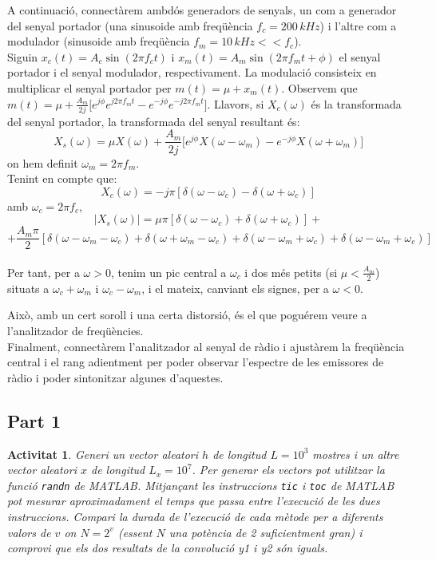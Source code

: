 \documentclass[11pt,a4]{article}
\numberwithin{equation}{section}
\theoremstyle{thmstyle}
\theoremstyle{thmstyle}
\theoremstyle{thmstyle}
\theoremstyle{thmstyle}
\theoremstyle{thmstyle}
\theoremstyle{thmstyle}
\theoremstyle{thmstyle}
\newtheorem{activity}{Activitat}
\begin{document}
A continuació, connectàrem ambdós generadors de senyals, un com a generador del senyal portador (una sinusoide amb freqüència $f_c=200\,kHz$) i l'altre com a modulador (sinusoide amb freqüència $f_m=10\,kHz << f_c$).
\\

Siguin $x_c(t)=A_c\sin(2\pi f_c t)$ i $x_m(t)=A_m\sin(2\pi f_m t+\phi)$ el senyal portador i el senyal modulador, respectivament. La modulació consisteix en multiplicar el senyal portador per $m(t)=\mu+x_m(t)$. Observem que $m(t) = \mu + \frac{A_m}{2j}\big[e^{j\phi} e^{j2\pi f_m t}-e^{-j\phi} e^{-j2\pi f_m t}\big]$.
Llavors, si $X_c(\omega)$ és la transformada del senyal portador, la transformada del senyal resultant és:
$$
X_s(\omega)=\mu X(\omega) + \frac{A_m}{2j}\big[e^{j\phi} X(\omega-\omega_m)-e^{-j\phi} X(\omega+\omega_m)\big]
$$
on hem definit $\omega_m = 2\pi f_m$.
\\

Tenint en compte que:
$$
X_c(\omega)=-j\pi[\delta(\omega-\omega_c)-\delta(\omega+\omega_c)]
$$
amb $\omega_c=2\pi f_c$,
$$
\vert X_s(\omega)\vert = \mu\pi[\delta(\omega-\omega_c) + \delta(\omega+\omega_c)]+
$$
$$
+\frac{A_m\pi}{2}[ \delta(\omega-\omega_m -\omega_c) + \delta(\omega+\omega_m -\omega_c) + \delta(\omega-\omega_m +\omega_c) + \delta(\omega-\omega_m +\omega_c)]
$$
\\

Per tant, per a $\omega>0$, tenim un pic central a $\omega_c$ i dos més petits (si $\mu<\frac{A_m}{2}$) situats a $\omega_c+\omega_m$ i $\omega_c-\omega_m$, i el mateix, canviant els signes, per a $\omega<0$.

Això, amb un cert soroll i una certa distorsió, és el que poguérem veure a l'analitzador de freqüències.
\\

Finalment, connectàrem l'analitzador al senyal de ràdio i ajustàrem la freqüència central i el rang adientment per poder observar l'espectre de les emissores de ràdio i poder sintonitzar algunes d'aquestes.
\\


\subsection{Part 1}

\begin{activity}
Generi un vector aleatori $h$ de longitud $L=10^3$ mostres i un altre vector aleatori $x$ de longitud $L_x=10^7$. Per generar els vectors pot utilitzar la funció {\tt randn} de MATLAB. Mitjançant les instruccions {\tt tic} i {\tt toc} de MATLAB pot mesurar aproximadament el temps que passa entre l’execució de les dues instruccions. Compari la durada de l’execució de cada mètode per a diferents valors de $v$ on $N=2^v$ (essent $N$ una potència de 2 suficientment gran) i comprovi que els dos resultats de la convolució y1 i y2 són iguals.
\end{activity}
\end{document}
